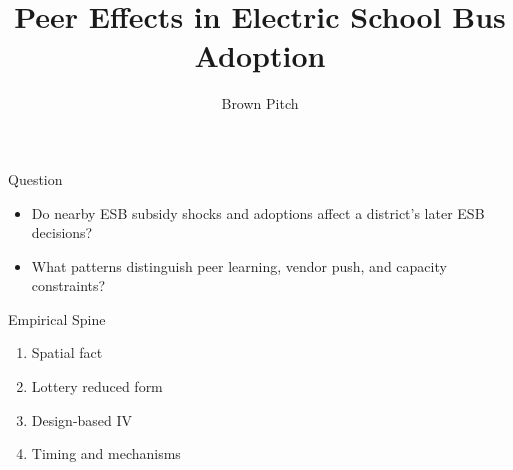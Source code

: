 \documentclass[aspectratio=169]{beamer}
\title{Peer Effects in Electric School Bus Adoption}
\author{}
\date{Brown Pitch}
\begin{document}
\begin{frame}
  \titlepage
\end{frame}

\begin{frame}{Question}
  \begin{itemize}
    \item Do nearby ESB subsidy shocks and adoptions affect a district's later ESB decisions?
    \item What patterns distinguish peer learning, vendor push, and capacity constraints?
  \end{itemize}
\end{frame}

\begin{frame}{Empirical Spine}
  \begin{enumerate}
    \item Spatial fact
    \item Lottery reduced form
    \item Design-based IV
    \item Timing and mechanisms
  \end{enumerate}
\end{frame}
\end{document}
